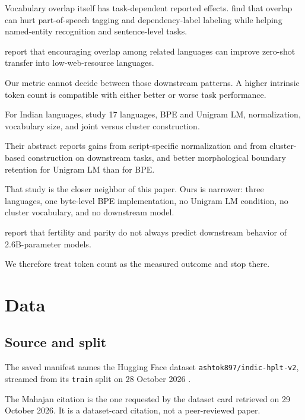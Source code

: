 \documentclass[10pt,twocolumn]{article}
\begin{document}
Vocabulary overlap itself has task-dependent reported
effects. \citet{limisiewicz-etal-2023-tokenization} find
that overlap can hurt part-of-speech tagging and
dependency-label labeling while helping named-entity
recognition and sentence-level tasks.

\citet{patil-etal-2022-overlap} report that encouraging
overlap among related languages can improve zero-shot
transfer into low-web-resource languages.

Our metric cannot decide between those downstream patterns.
A higher intrinsic token count is compatible with either
better or worse task performance.

For Indian languages, \citet{brahma-etal-2026-multilingual}
study 17 languages, BPE and Unigram LM, normalization,
vocabulary size, and joint versus cluster construction.

Their abstract reports gains from script-specific
normalization and from cluster-based construction on
downstream tasks, and better morphological boundary
retention for Unigram LM than for BPE.

That study is the closer neighbor of this paper. Ours is
narrower: three languages, one byte-level BPE implementation,
no Unigram LM condition, no cluster vocabulary, and no
downstream model.

\citet{ali-etal-2024-tokenizer} report that fertility and
parity do not always predict downstream behavior of
2.6B-parameter models.

We therefore treat token count as the measured outcome
and stop there.


\section{Data}

\subsection{Source and split}

The saved manifest names the Hugging Face dataset
\texttt{ashtok897/indic-hplt-v2}, streamed from its
\texttt{train} split on 28 October 2026
\citep{mahajan-2026-indic-hplt}.

The Mahajan citation is the one requested by the dataset
card retrieved on 29 October 2026. It is a dataset-card
citation, not a peer-reviewed paper.
\end{document}
